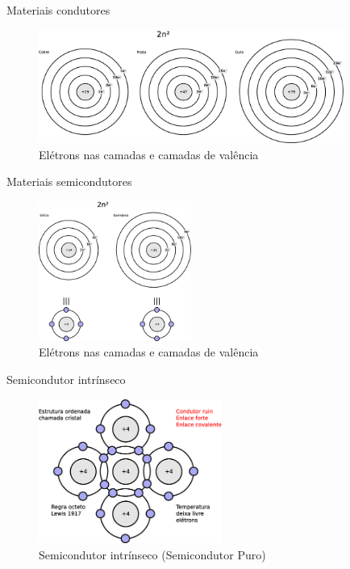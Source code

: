 \documentclass[envcountsect,dvips]{beamer}
\begin{document}
\begin{frame}{Materiais condutores   }
\begin{figure}
\centering
\includegraphics[width=10cm]{images/cobre.eps}
\caption{Elétrons nas camadas e camadas de valência}
\label{fig:dopagem}
\end{figure}
\end{frame}

\begin{frame}{Materiais semicondutores}
\begin{figure}
\centering
\includegraphics[width=5cm]{images/sige.eps}
\caption{Elétrons nas camadas e camadas de valência}
\label{fig:sige}
\end{figure}
\end{frame}

\begin{frame}{Semicondutor intrínseco}
\begin{figure}
\centering
\includegraphics[width=6cm]{images/covalente.eps}
\caption{Semicondutor intrínseco (Semicondutor Puro)}
\label{fig:sige}
\end{figure}
\end{frame}
\end{document}
